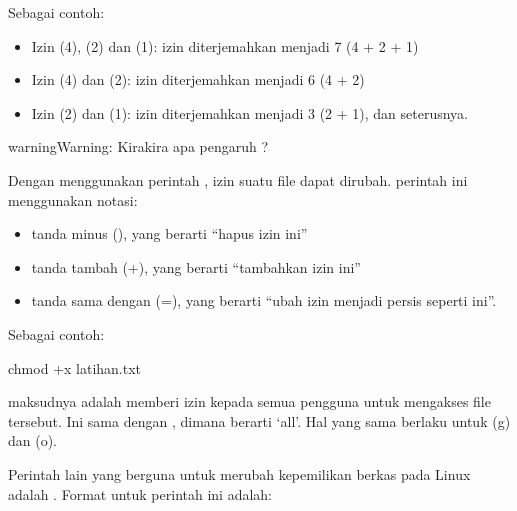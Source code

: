 \documentclass[letterpaper,10pt,english]{sphinxmanual}
\begin{document}
Sebagai contoh:
\begin{itemize}
\item {} 
Izin  (4),  (2) dan  (1): izin  diterjemahkan menjadi 7 (4 + 2 + 1)

\item {} 
Izin  (4) dan  (2): izin  diterjemahkan menjadi 6 (4 + 2)

\item {} 
Izin  (2) dan  (1): izin  diterjemahkan menjadi 3 (2 + 1), dan seterusnya.

\end{itemize}

\begin{sphinxadmonition}{warning}{Warning:}
Kira\sphinxhyphen{}kira apa pengaruh ?
\end{sphinxadmonition}

Dengan menggunakan perintah , izin suatu file dapat dirubah. perintah ini menggunakan notasi:
\begin{itemize}
\item {} 
tanda minus (\sphinxhyphen{}), yang berarti “hapus izin ini”

\item {} 
tanda tambah (+), yang berarti “tambahkan izin ini”

\item {} 
tanda sama dengan (=), yang berarti “ubah izin menjadi persis seperti ini”.

\end{itemize}

Sebagai contoh:

\begin{sphinxVerbatim}[commandchars=\\\{\}]
chmod +x latihan.txt
\end{sphinxVerbatim}

maksudnya adalah memberi izin kepada semua pengguna untuk mengakses file tersebut. Ini sama dengan , dimana  berarti ‘all’. Hal yang sama berlaku untuk  (g) dan  (o).

Perintah lain yang berguna untuk merubah kepemilikan berkas pada Linux adalah . Format untuk perintah ini adalah:
\end{document}

